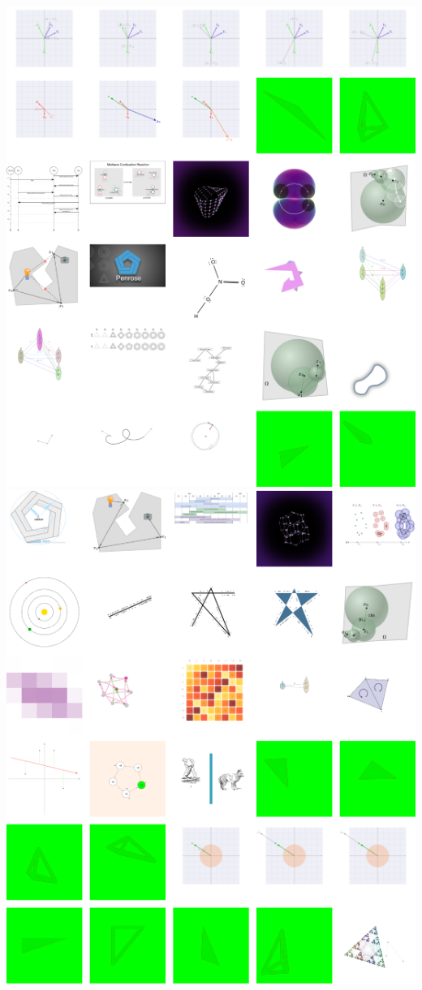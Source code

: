 \pagebreak
\includegraphics[width=\linewidth]{assets/appendix/Group 11.png}
\pagebreak
\includegraphics[width=\linewidth]{assets/appendix/Group 12.png}
